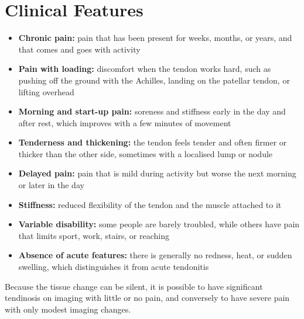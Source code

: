 \section*{Clinical Features}
\begin{itemize}
    \item \textbf{Chronic pain:} pain that has been present for weeks, months, or years, and that comes and goes with activity
    \item \textbf{Pain with loading:} discomfort when the tendon works hard, such as pushing off the ground with the Achilles, landing on the patellar tendon, or lifting overhead
    \item \textbf{Morning and start-up pain:} soreness and stiffness early in the day and after rest, which improves with a few minutes of movement
    \item \textbf{Tenderness and thickening:} the tendon feels tender and often firmer or thicker than the other side, sometimes with a localised lump or nodule
    \item \textbf{Delayed pain:} pain that is mild during activity but worse the next morning or later in the day
    \item \textbf{Stiffness:} reduced flexibility of the tendon and the muscle attached to it
    \item \textbf{Variable disability:} some people are barely troubled, while others have pain that limits sport, work, stairs, or reaching
    \item \textbf{Absence of acute features:} there is generally no redness, heat, or sudden swelling, which distinguishes it from acute tendonitis
\end{itemize}

Because the tissue change can be silent, it is possible to have significant tendinosis on imaging with little or no pain, and conversely to have severe pain with only modest imaging changes.

